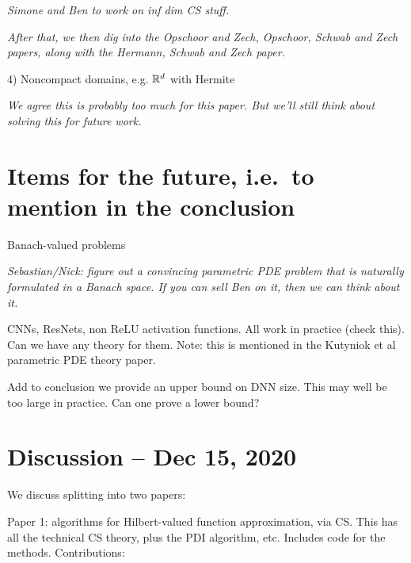 \documentclass[11pt]{article}
\begin{document}
\textit{Simone and Ben to work on inf dim CS stuff.}

\textit{After that, we then dig into the Opschoor and Zech, Opschoor, Schwab and Zech papers, along with the Hermann, Schwab and Zech paper.}

4) Noncompact domains, e.g. $\mathbb{R}^d$ with Hermite

\textit{We agree this is probably too much for this paper. But we'll still think about solving this for future work.}

\section{Items for the future, i.e.\ to mention in the conclusion}

Banach-valued problems

\textit{Sebastian/Nick: figure out a convincing parametric PDE problem that is naturally formulated in a Banach space. If you can sell Ben on it, then we can think about it.}

CNNs, ResNets, non ReLU activation functions. All work in practice (check this). Can we have any theory for them. Note: this is mentioned in the Kutyniok et al parametric PDE theory paper.

Add to conclusion we provide an upper bound on DNN size. This may well be too large in practice. Can one prove a lower bound?

\section*{Discussion -- Dec 15, 2020}

We discuss splitting into two papers:

Paper 1: algorithms for Hilbert-valued function approximation, via CS. This has all the technical CS theory, plus the PDI algorithm, etc. Includes code for the methods. Contributions:
\end{document}

